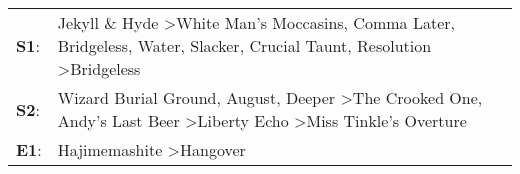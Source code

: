 \begin{supertabular}{p{0.03\textwidth}p{0.92\textwidth}}
 \textbf{S1}:  &  Jekyll \& Hyde\textsuperscript{} \textgreater \enspace White Man's Moccasins\textsuperscript{}, \enspace Comma Later\textsuperscript{}, \enspace Bridgeless\textsuperscript{}, \enspace Water\textsuperscript{}, \enspace Slacker\textsuperscript{}, \enspace Crucial Taunt\textsuperscript{}, \enspace Resolution\textsuperscript{} \textgreater \enspace Bridgeless\textsuperscript{}  \enspace  \\
 \textbf{S2}:  &                                                    Wizard Burial Ground\textsuperscript{}, \enspace August\textsuperscript{}, \enspace Deeper\textsuperscript{} \textgreater \enspace The Crooked One\textsuperscript{}, \enspace Andy's Last Beer\textsuperscript{} \textgreater \enspace Liberty Echo\textsuperscript{} \textgreater \enspace Miss Tinkle's Overture\textsuperscript{}  \enspace  \\
 \textbf{E1}:  &                                                                                                                                                                                                                                                                                                         Hajimemashite\textsuperscript{} \textgreater \enspace Hangover\textsuperscript{}  \enspace  \\
\end{supertabular}
